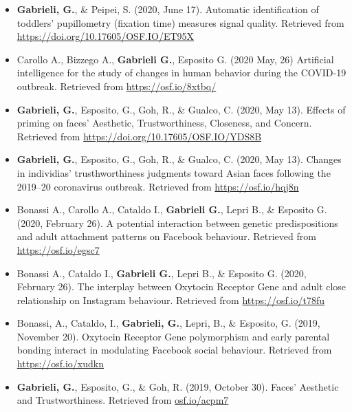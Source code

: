 \documentclass[10pt,a4paper]{altacv}
\begin{document}
\begin{fullwidth}
\begin{itemize}
			\item \textbf{Gabrieli, G.}, \& Peipei, S. (2020, June 17). Automatic identification of toddlers’ pupillometry (fixation time) measures signal quality. Retrieved from \href{https://doi.org/10.17605/OSF.IO/ET95X}{https://doi.org/10.17605/OSF.IO/ET95X}
			
			\item Carollo A., Bizzego A., \textbf{Gabrieli G.}, Esposito G. (2020 May, 26) Artificial intelligence for the study of changes in human behavior during the COVID-19 outbreak. Retrieved from \href{https://osf.io/8xtbq/}{https://osf.io/8xtbq/}
			
			\item \textbf{Gabrieli, G.}, Esposito, G., Goh, R., \& Gualco, C. (2020, May 13). Effects of priming on faces' Aesthetic, Trustworthiness, Closeness, and Concern. Retrieved from \href{https://doi.org/10.17605/OSF.IO/YDS8B}{https://doi.org/10.17605/OSF.IO/YDS8B}
			
			\item \textbf{Gabrieli, G.}, Esposito, G., Goh, R., \& Gualco, C. (2020, May 13). Changes in individias' trusthworthiness judgments toward Asian faces following the 2019–20 coronavirus outbreak. Retrieved from \href{https://osf.io/hqj8n}{https://osf.io/hqj8n}
			
			\item Bonassi A., Carollo A., Cataldo I., \textbf{Gabrieli G.}, Lepri B., \& Esposito G. (2020, February 26). A potential interaction between genetic predispositions and adult attachment patterns on Facebook behaviour. Retrieved from \href{https://osf.io/egsc7}{https://osf.io/egsc7}
			
			\item Bonassi A., Cataldo I., \textbf{Gabrieli G.}, Lepri B., \& Esposito G. (2020, February 26). The interplay between Oxytocin Receptor Gene and adult close relationship on Instagram behaviour. Retrieved from \href{https://osf.io/t78fu}{https://osf.io/t78fu}
			
			\item Bonassi, A., Cataldo, I., \textbf{Gabrieli, G.}, Lepri, B., \& Esposito, G. (2019, November 20). Oxytocin Receptor Gene polymorphism and early parental bonding interact in modulating Facebook social behaviour. Retrieved from \href{https://osf.io/xudkn}{https://osf.io/xudkn}
			
			\item \textbf{Gabrieli, G.}, Esposito, G., \& Goh, R. (2019, October 30). Faces' Aesthetic and Trustworthiness. Retrieved from \href{https://osf.io/acpm7}{osf.io/acpm7}
			

\end{itemize}
\end{fullwidth}
\end{document}
